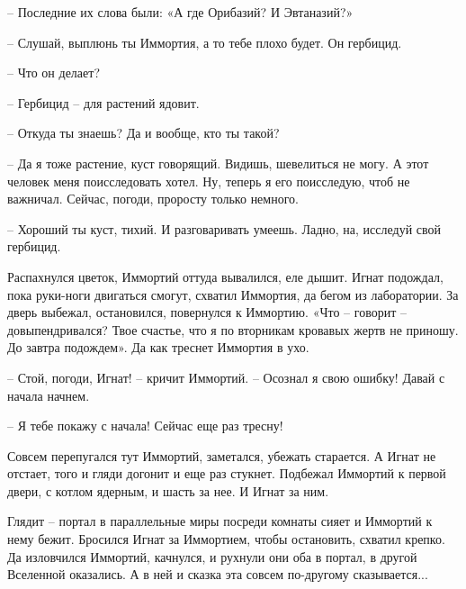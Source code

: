\documentclass[ebook,oneside,final,openright]{memoir}
\begin{document}
– Последние их слова были: «А где Орибазий? И Эвтаназий?»\par
– Слушай, выплюнь ты Иммортия, а то тебе плохо будет. Он гербицид.\par
– Что он делает?\par
– Гербицид – для растений ядовит.\par
– Откуда ты знаешь? Да и вообще, кто ты такой?\par
– Да я тоже растение, куст говорящий. Видишь, шевелиться не могу. А этот человек меня поисследовать хотел. Ну, теперь я его поисследую, чтоб не важничал. Сейчас, погоди, проросту только немного.\par
– Хороший ты куст, тихий. И разговаривать умеешь. Ладно, на, исследуй свой гербицид.\par
\par
Распахнулся цветок, Иммортий оттуда вывалился, еле дышит. Игнат подождал, пока руки-ноги двигаться смогут, схватил Иммортия, да бегом из лаборатории. За дверь выбежал, остановился, повернулся к Иммортию. «Что – говорит – довыпендривался? Твое счастье, что я по вторникам кровавых жертв не приношу. До завтра подождем». Да как треснет Иммортия в ухо.\par
\par
– Стой, погоди, Игнат! – кричит Иммортий. – Осознал я свою ошибку! Давай с начала начнем.\par
– Я тебе покажу с начала! Сейчас еще раз тресну!\par
\par
Совсем перепугался тут Иммортий, заметался, убежать старается. А Игнат не отстает, того и гляди догонит и еще раз стукнет. Подбежал Иммортий к первой двери, с котлом ядерным, и шасть за нее. И Игнат за ним.\par
\par
Глядит – портал в параллельные миры посреди комнаты сияет и Иммортий к нему бежит. Бросился Игнат за Иммортием, чтобы остановить, схватил крепко. Да изловчился Иммортий, качнулся, и рухнули они оба в портал, в другой Вселенной оказались. А в ней и сказка эта совсем по-другому сказывается...\par
\end{document}
